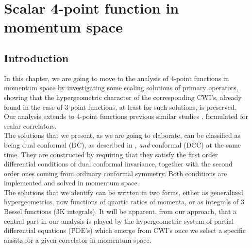 \documentclass[a4paper,11pt,openright,twoside]{book}
\numberwithin{equation}{section}
\begin{document}
{\chapter{Scalar 4-point function in momentum space}
\section{Introduction}
In this chapter, we are going to move to the analysis of 4-point functions in momentum space by investigating some scaling solutions of primary operators, showing that the hypergeometric character of the corresponding CWI's, already found in the case of 3-point functions, at least for such solutions, is preserved. Our analysis extends to  4-point functions  previous similar studies \cite{Coriano:2013jba,Bzowski:2013sza,Coriano:2018bsy,Coriano:2018bbe,Coriano:2018zdo,Bzowski:2015yxv,Bzowski:2018fql}, formulated for scalar correlators. \\
The solutions that we present, as we are going to elaborate, 
can be classified as being dual conformal (DC), as described in \cite{Drummond:2006rz,Drummond:2007aua,Drummond:2008vq}, {\em and} conformal (DCC) at the same time. They are constructed by requiring that they satisfy the first order differential conditions of dual conformal invariance, together with the second order ones coming from ordinary conformal symmetry. Both conditions are implemented and solved in momentum space.\\
The solutions that we identify can be written in two forms, either as generalized hypergeometrics, now functions of quartic ratios of momenta, or as integrals of 3 Bessel functions (3K integrals). It will be apparent, from our approach, that a central part in our analysis is played by the hypergeometric system of partial differential equations (PDE's) which emerge from CWI's once we select a specific ans\"atz for a given correlator in momentum space.

}
\end{document}
